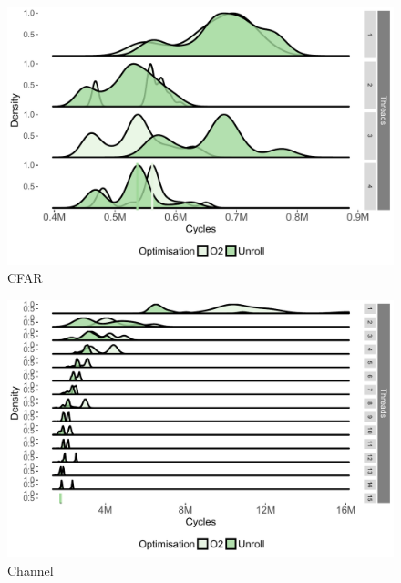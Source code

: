 \begin{appendices}
\begin{figure}[!htb]
\center
\includegraphics[width=1\textwidth]{streamit-paper/graphics/appendixgraphs/cfar-total.pdf}
\caption{CFAR}\label{chp:stream:ct}
\end{figure}

\begin{figure}[!htb]
\center
\includegraphics[width=1\textwidth]{streamit-paper/graphics/appendixgraphs/channel-total.pdf}
\caption{Channel}\label{chp:stream:ct2}
\end{figure}


\end{appendices}
